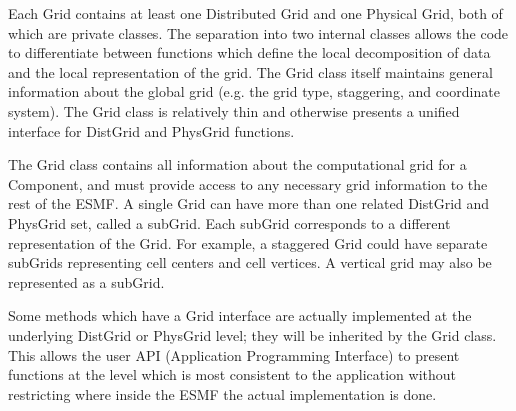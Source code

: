 


Each Grid contains at least one Distributed Grid and one Physical Grid, both
of which are private classes.
The separation into two internal classes allows the code to differentiate
between functions which define the local decomposition of data and
the local representation of the grid.  The Grid class itself maintains
general information about the global grid (e.g. the grid type, staggering,
and coordinate system).  The Grid class is relatively thin and
otherwise presents a unified interface for DistGrid and PhysGrid
functions.

The Grid class contains all information about the computational grid
for a Component, and must provide access to any necessary grid information
to the rest of the ESMF.  A single Grid can have more than one related
DistGrid and PhysGrid set, called a subGrid.  Each subGrid corresponds to
a different representation of the Grid.  For example, a staggered Grid could
have separate subGrids representing cell centers and cell vertices.  A
vertical grid may also be represented as a subGrid.

Some methods which have a Grid interface are actually implemented
at the underlying DistGrid or PhysGrid level; they will be inherited
by the Grid class.  This allows the user API (Application Programming
Interface) to present functions at the level which is most consistent
to the application without restricting where inside the ESMF the actual
implementation is done.
